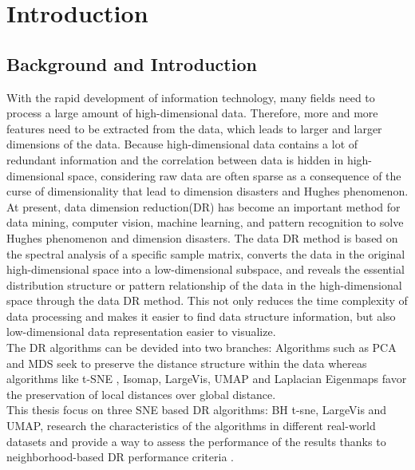 \part{Introduction} \label{part:how is the conclusion}

\chapter{Background and Introduction}


With the rapid development of information technology, many fields need to process a large amount of high-dimensional data. Therefore, more and more features need to be extracted from the data, which leads to larger and larger dimensions of the data. Because high-dimensional data contains a lot of redundant information and the correlation between data is hidden in high-dimensional space, considering raw data are often sparse as a consequence of the curse of dimensionality that lead to dimension disasters and Hughes phenomenon.\\

\noindent At present, data dimension reduction(DR) has become an important method for data mining, computer vision, machine learning, and pattern recognition to solve Hughes phenomenon and dimension disasters. The data DR method is based on the spectral analysis of a specific sample matrix, converts the data in the original high-dimensional space into a low-dimensional subspace, and reveals the essential distribution structure or pattern relationship of the data in the high-dimensional space through the data DR method. This not only reduces the time complexity of data processing and makes it easier to find data structure information, but also low-dimensional data representation easier to visualize.\\


\noindent The DR algorithms can be devided into two branches: Algorithms such as PCA and MDS seek to preserve the distance structure within the data whereas algorithms like t-SNE , Isomap, LargeVis, UMAP and Laplacian Eigenmaps favor the preservation of local distances over global distance.\\

\noindent This thesis focus on three SNE based DR algorithms: BH t-sne, LargeVis and UMAP, research the characteristics of the algorithms in different real-world datasets and provide a way to assess the performance of the results thanks to neighborhood-based DR performance criteria \cite{ref4}.


